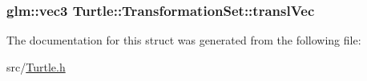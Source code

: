 \subsubsection[{\texorpdfstring{transl\+Vec}{translVec}}]{\setlength{\rightskip}{0pt plus 5cm}glm\+::vec3 Turtle\+::\+Transformation\+Set\+::transl\+Vec}\hypertarget{struct_turtle_1_1_transformation_set_aa6c7ef2414c618090e25d89574cc4af7}{}\label{struct_turtle_1_1_transformation_set_aa6c7ef2414c618090e25d89574cc4af7}


The documentation for this struct was generated from the following file\+:\begin{DoxyCompactItemize}
\item 
src/\hyperlink{_turtle_8h}{Turtle.\+h}\end{DoxyCompactItemize}
